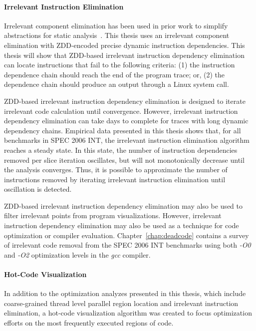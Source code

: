 \documentclass[defaultstyle,11pt]{thesis}
\begin{document}
\noindent\paragraph{Irrelevant Instruction Elimination}

Irrelevant component elimination has been used in prior work to
simplify abstractions for static analysis~\cite{corbett:icsc:2000}.
This thesis uses an irrelevant component elimination with ZDD-encoded
precise dynamic instruction dependencies.  This thesis will show that
ZDD-based irrelevant instruction dependency elimination can locate
instructions that fail to the following criteria: (1) the instruction
dependence chain should reach the end of the program trace; or, (2)
the dependence chain should produce an output through a Linux system
call.

ZDD-based irrelevant instruction dependency elimination is designed to
iterate irrelevant code calculation until convergence.  However,
irrelevant instruction dependency elimination can take days to
complete for traces with long dynamic dependency chains. Empirical
data presented in this thesis shows that, for all benchmarks in SPEC
2006 INT, the irrelevant instruction elimination algorithm reaches a
steady state.  In this state, the number of instruction dependencies
removed per slice iteration oscillates, but will not monotonically
decrease until the analysis converges.  Thus, it is possible to
approximate the number of instructions removed by iterating irrelevant
instruction elimination until oscillation is detected.

ZDD-based irrelevant instruction dependency elimination may also be
used to filter irrelevant points from program visualizations. However,
irrelevant instruction dependency elimination may also be used as a
technique for code optimization or compiler evaluation.
Chapter~\ref{chap:deadcode} contains a survey of irrelevant code
removal from the SPEC 2006 INT benchmarks using both \textit{-O0} and
\textit{-O2} optimization levels in the \textit{gcc} compiler.

\noindent\paragraph{Hot-Code Visualization}

In addition to the optimization analyzes presented in this thesis,
which include coarse-grained thread level parallel region location and
irrelevant instruction elimination, a hot-code visualization algorithm
was created to focus optimization efforts on the most frequently
executed regions of code.
\end{document}

